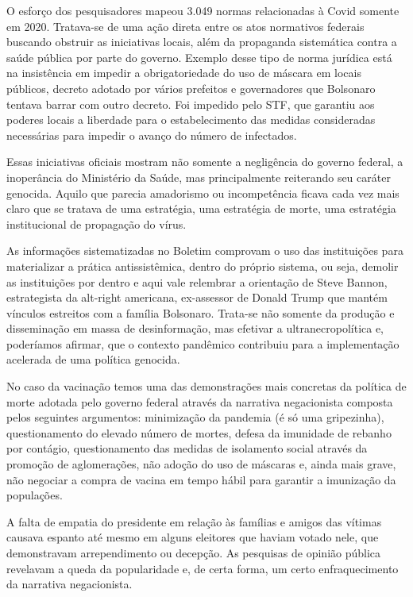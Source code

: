 O esforço dos pesquisadores mapeou 3.049 normas relacionadas à Covid
somente em 2020. Tratava-se de uma ação direta entre os atos normativos
federais buscando obstruir as iniciativas locais, além da propaganda
sistemática contra a saúde pública por parte do governo. Exemplo desse
tipo de norma jurídica está na insistência em impedir a obrigatoriedade
do uso de máscara em locais públicos, decreto adotado por vários
prefeitos e governadores que Bolsonaro tentava barrar com outro decreto.
Foi impedido pelo STF, que garantiu aos poderes locais a liberdade para
o estabelecimento das medidas consideradas necessárias para impedir o
avanço do número de infectados.

Essas iniciativas oficiais mostram não somente a negligência do governo
federal, a inoperância do Ministério da Saúde, mas principalmente
reiterando seu caráter genocida. Aquilo que parecia amadorismo ou
incompetência ficava cada vez mais claro que se tratava de uma
estratégia, uma estratégia de morte, uma estratégia institucional de
propagação do vírus.

As informações sistematizadas no Boletim comprovam o uso das
instituições para materializar a prática antissistêmica, dentro do
próprio sistema, ou seja, demolir as instituições por dentro e aqui vale
relembrar a orientação de Steve Bannon, estrategista da alt-right
americana, ex-assessor de Donald Trump que mantém vínculos estreitos com
a família Bolsonaro. Trata-se não somente da produção e disseminação em
massa de desinformação, mas efetivar a ultranecropolítica e, poderíamos
afirmar, que o contexto pandêmico contribuiu para a implementação
acelerada de uma política genocida.

No caso da vacinação temos uma das demonstrações mais concretas da
política de morte adotada pelo governo federal através da narrativa
negacionista composta pelos seguintes argumentos: minimização da
pandemia (é só uma gripezinha), questionamento do elevado número de
mortes, defesa da imunidade de rebanho por contágio, questionamento das
medidas de isolamento social através da promoção de aglomerações, não
adoção do uso de máscaras e, ainda mais grave, não negociar a compra de
vacina em tempo hábil para garantir a imunização da populações.

A falta de empatia do presidente em relação às famílias e amigos das
vítimas causava espanto até mesmo em alguns eleitores que haviam votado
nele, que demonstravam arrependimento ou decepção. As pesquisas de
opinião pública revelavam a queda da popularidade e, de certa forma, um
certo enfraquecimento da narrativa negacionista.

